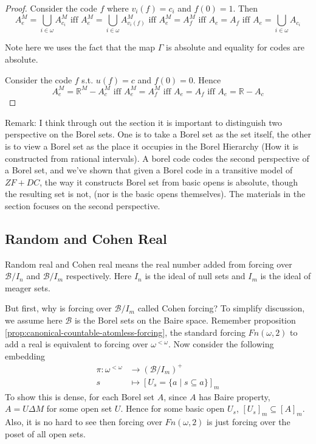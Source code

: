 \documentclass{article}
\begin{document}
\begin{proof}
    Consider the code $f$ where $v_i(f) = c_i$ and $f(0) = 1$. Then $$A_e^M = \bigcup_{i\in \omega}A_{c_i}^M\text{ iff }A_e^M = \bigcup_{i\in \omega}A_{v_i(f)}^M \text{ iff } A_e^M = A_f^M \text{ iff }A_e = A_f \text{ iff }A_e = \bigcup_{i\in \omega}A_{c_i}$$

    Note here we uses the fact that the map $\Gamma$ is absolute and equality for codes are absolute.

    Consider the code $f$ s.t. $u(f) = c$ and $f(0) = 0$. Hence $$A_e^M = \mathbb{R}^M - A_c^M \text{ iff }A_e^M = A_f^M \text{ iff } A_e = A_f \text{ iff } A_e = \mathbb{R}- A_c $$
\end{proof}

Remark: I think through out the section it is important to distinguish two perspective on the Borel sets. One is to take a Borel set as the set itself, the other is to view a Borel set as the place it occupies in the Borel Hierarchy (How it is constructed from rational intervals). A borel code codes the second perspective of a Borel set, and we've shown that given a Borel code in a transitive model of $ZF+DC$, the way it constructs Borel set from basic opens is absolute, though the resulting set is not, (nor is the basic opens themselves). The materials in the section focuses on the second perspective.


\subsection{Random and Cohen Real}

Random real and Cohen real means the real number added from forcing over $\mathcal{B}/I_n$ and $\mathcal{B}/I_m$ respectively. Here $I_n$ is the ideal of null sets and $I_m$ is the ideal of meager sets.

But first, why is forcing over $\mathcal{B}/I_m$ called Cohen forcing? To simplify discussion, we assume here $\mathcal{B}$ is the Borel sets on the Baire space. Remember proposition \ref{prop:canonical-countable-atomless-forcing}, the standard forcing $Fn(\omega,2)$ to add a real is equivalent to forcing over $\omega^{<\omega}$. Now consider the following embedding \begin{align*}
    \pi:  \omega^{<\omega} &\to (\mathcal{B}/I_m)^+\\
    s &\mapsto [U_s = \{a\mid s\subseteq a\}]_m
\end{align*}
To show this is dense, for each Borel set $A$, since $A$ has Baire property, $A = U\Delta M$ for some open set $U$. Hence for some basic open $U_s$, $[U_s]_m\subseteq [A]_m$. Also, it is no hard to see then forcing over $Fn(\omega,2)$ is just forcing over the poset of all open sets.
\end{document}

